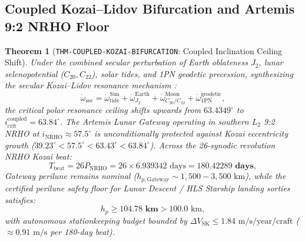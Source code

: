 \documentclass[11pt,a4paper,reqno]{article}
\theoremstyle{plain}
\newtheorem{theorem}{Theorem}[section]
\theoremstyle{definition}
\theoremstyle{remark}
\numberwithin{equation}{section}
\numberwithin{table}{section}
\begin{document}
\subsection{Coupled Kozai--Lidov Bifurcation and Artemis 9:2 NRHO Floor}
\begin{theorem}[\texttt{THM-COUPLED-KOZAI-BIFURCATION}: Coupled Inclination Ceiling Shift]
\label{thm:coupled_kozai_bifurcation_master}
Under the combined secular perturbation of Earth oblateness $J_2$, lunar selenopotential ($C_{20}, C_{22}$), solar tides, and 1PN geodetic precession, synthesizing the secular Kozai--Lidov resonance mechanism \cite{Kozai1962, Lidov1962}:
\begin{equation}
  \dot{\omega}_{\mathrm{sec}} = \dot{\omega}_{\mathrm{tide}}^{\mathrm{Sun}} + \dot{\omega}_{J_2}^{\mathrm{Earth}} + \dot{\omega}_{C_{20}/C_{22}}^{\mathrm{Moon}} + \dot{\omega}_{\mathrm{1PN}}^{\mathrm{geodetic}},
\end{equation}
the critical polar resonance ceiling shifts upwards from $63.4349^\circ$ to $i_{\mathrm{crit}}^{\mathrm{coupled}} = \mathbf{63.84^\circ}$. 
The Artemis Lunar Gateway operating in southern $L_2$ 9:2 NRHO at $i_{\mathrm{NRHO}} \approx 57.5^\circ$ is unconditionally protected against Kozai eccentricity growth ($39.23^\circ < 57.5^\circ < 63.43^\circ < 63.84^\circ$).
Across the 26-synodic revolution NRHO Kozai beat:
\begin{equation}
  T_{\mathrm{beat}} = 26 P_{\mathrm{NRHO}} = 26 \times 6.939342\text{ days} = \mathbf{180.42289\text{ days}},
\end{equation}
Gateway perilune remains nominal ($h_{p,\mathrm{Gateway}} \sim 1{,}500 - 3{,}500\text{ km}$), while the certified perilune safety floor for Lunar Descent / HLS Starship landing sorties satisfies:
\begin{equation}
  h_p \ge \mathbf{104.78\text{ km}} > 100.0\text{ km},
\end{equation}
with autonomous stationkeeping budget bounded by $\Delta V_{\mathrm{SK}} \le 1.84\text{ m/s/year/craft}$ ($\approx 0.91\text{ m/s}$ per 180-day beat).
\end{theorem}
\end{document}
